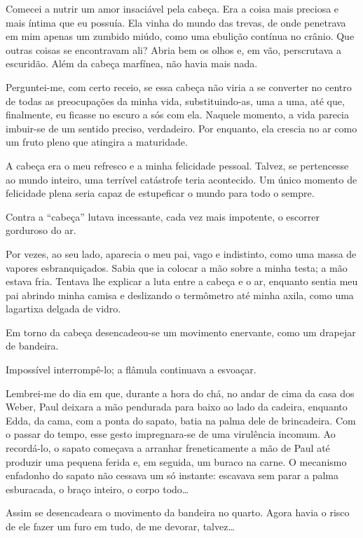 Comecei a nutrir um amor insaciável pela cabeça. Era a coisa mais preciosa e mais íntima que eu possuía. Ela vinha do mundo das trevas, de onde penetrava em mim apenas um zumbido miúdo, como uma ebulição contínua no crânio. Que outras coisas se encontravam ali? Abria bem os olhos e, em vão, perscrutava a escuridão. Além da cabeça marfínea, não havia mais nada.

Perguntei-me, com certo receio, se essa cabeça não viria a se converter no centro de todas as preocupações da minha vida, substituindo-as, uma a uma, até que, finalmente, eu ficasse no escuro a sós com ela. Naquele momento, a vida parecia imbuir-se de um sentido preciso, verdadeiro. Por enquanto, ela crescia no ar como um fruto pleno que atingira a maturidade.

A cabeça era o meu refresco e a minha felicidade pessoal. Talvez, se pertencesse ao mundo inteiro, uma terrível catástrofe teria acontecido. Um único momento de felicidade plena seria capaz de estupeficar o mundo para todo o sempre.

Contra a ``cabeça'' lutava incessante, cada vez mais impotente, o escorrer gorduroso do ar.

Por vezes, ao seu lado, aparecia o meu pai, vago e indistinto, como uma massa de vapores esbranquiçados. Sabia que ia colocar a mão sobre a minha testa; a mão estava fria. Tentava lhe explicar a luta entre a cabeça e o ar, enquanto sentia meu pai abrindo minha camisa e deslizando o termômetro até minha axila, como uma lagartixa delgada de vidro.

Em torno da cabeça desencadeou-se um movimento enervante, como um drapejar de bandeira.

Impossível interrompê-lo; a flâmula continuava a esvoaçar.

Lembrei-me do dia em que, durante a hora do chá, no andar de cima da casa dos Weber, Paul deixara a mão pendurada para baixo ao lado da cadeira, enquanto Edda, da cama, com a ponta do sapato, batia na palma dele de brincadeira. Com o passar do tempo, esse gesto impregnara-se de uma virulência incomum. Ao recordá-lo, o sapato começava a arranhar freneticamente a mão de Paul até produzir uma pequena ferida e, em seguida, um buraco na carne. O mecanismo enfadonho do sapato não cessava um só instante: escavava sem parar a palma esburacada, o braço inteiro, o corpo todo\dots

Assim se desencadeara o movimento da bandeira no quarto. Agora havia o risco de ele fazer um furo em tudo, de me devorar, talvez\dots

